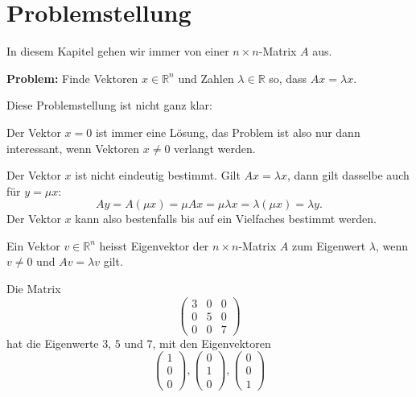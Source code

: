 %
%
%
\section{Problemstellung}
In diesem Kapitel gehen wir immer von einer $n\times n$-Matrix $A$ aus.

\medskip
{\parindent0pt \bf Problem:} Finde Vektoren $x\in\mathbb R^n$ und
Zahlen $\lambda\in\mathbb R$ so, dass $Ax=\lambda x$.
\medskip

{\parindent0pt Diese Problemstellung ist nicht ganz klar:}
\begin{compactitem}
\item Der Vektor $x=0$ ist immer eine Lösung, das Problem ist also
nur dann interessant, wenn Vektoren $x\ne 0$ verlangt werden.
\item Der Vektor $x$ ist nicht eindeutig bestimmt.
Gilt $Ax=\lambda x$, dann gilt dasselbe auch für $y=\mu x$:
\[
Ay= A(\mu x)=\mu Ax=\mu\lambda x = \lambda (\mu x)=\lambda y.
\]
Der Vektor $x$ kann also bestenfalls bis auf ein Vielfaches bestimmt werden.
\end{compactitem}

\begin{definition}
Ein Vektor $v \in \mathbb R^n$ heisst Eigenvektor der $n\times n$-Matrix $A$
zum Eigenwert $\lambda$, wenn $v\ne 0$ und $Av=\lambda v$ gilt.
\end{definition}

\begin{beispiel}
Die Matrix
\[
\begin{pmatrix}
3&0&0\\
0&5&0\\
0&0&7
\end{pmatrix}
\]
hat die Eigenwerte $3$, $5$ und $7$, mit den Eigenvektoren
\[
\begin{pmatrix}
1\\0\\0
\end{pmatrix}
,
\begin{pmatrix}
0\\1\\0
\end{pmatrix}
,
\begin{pmatrix}
0\\0\\1
\end{pmatrix}
\]
\end{beispiel}

